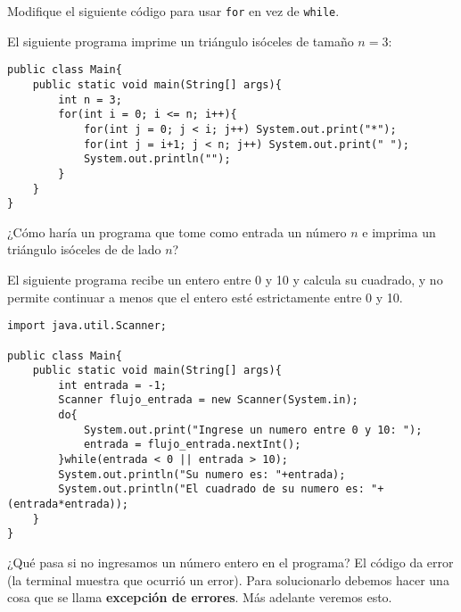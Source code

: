 \documentclass[12pt]{article}
\theoremstyle{largebreak}
\begin{document}
    \begin{excer}
        Modifique el siguiente código para usar \lstinline|for| en vez de \lstinline|while|.
    \end{excer}

    \begin{exa}
        El siguiente programa imprime un triángulo isóceles de tamaño $n=3$:
        \begin{lstlisting}[caption={Programa que imprime un triángulo de tamaño $n=3$.},label=DescriptiveLabel]
public class Main{
    public static void main(String[] args){
        int n = 3;
        for(int i = 0; i <= n; i++){
            for(int j = 0; j < i; j++) System.out.print("*");
            for(int j = i+1; j < n; j++) System.out.print(" ");
            System.out.println("");
        }
    }
}
        \end{lstlisting}
    \end{exa}

    \begin{excer}
        ¿Cómo haría un programa que tome como entrada un número $n$ e imprima un triángulo isóceles de de lado $n$?
    \end{excer}

    \begin{exa}
        El siguiente programa recibe un entero entre 0 y 10 y calcula su cuadrado, y no permite continuar a menos que el entero esté estrictamente entre 0 y 10.
        \begin{lstlisting}[caption={Programa que recibe entero entre 0 y 10.},label=DescriptiveLabel]
import java.util.Scanner;

public class Main{
    public static void main(String[] args){
        int entrada = -1;
        Scanner flujo_entrada = new Scanner(System.in);
        do{
            System.out.print("Ingrese un numero entre 0 y 10: ");
            entrada = flujo_entrada.nextInt();
        }while(entrada < 0 || entrada > 10);
        System.out.println("Su numero es: "+entrada);
        System.out.println("El cuadrado de su numero es: "+(entrada*entrada));
    }
}
        \end{lstlisting}
        ¿Qué pasa si no ingresamos un número entero en el programa? El código da error (la terminal muestra que ocurrió un error). Para solucionarlo debemos hacer una cosa que se llama \textbf{excepción de errores}. Más adelante veremos esto.
    \end{exa}
\end{document}

